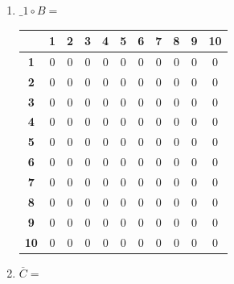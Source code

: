 \documentclass[a4paper,14pt]{extarticle}
\begin{document}
\begin{enumerate}[label=1.\arabic*.]
\begin{enumerate}[1) ]
		      \item $\_1 \circ B = $  \begin{tabular}{|c|c|c|c|c|c|c|c|c|c|c|}
			            \hline
			                              & \textbf{1} & \textbf{2} & \textbf{3} & \textbf{4} & \textbf{5} & \textbf{6} & \textbf{7} & \textbf{8} & \textbf{9} & \textbf{10} \\
			            \hline\textbf{1}  & 0          & 0          & 0          & 0          & 0          & 0          & 0          & 0          & 0          & 0           \\
			            \hline\textbf{2}  & 0          & 0          & 0          & 0          & 0          & 0          & 0          & 0          & 0          & 0           \\
			            \hline\textbf{3}  & 0          & 0          & 0          & 0          & 0          & 0          & 0          & 0          & 0          & 0           \\
			            \hline\textbf{4}  & 0          & 0          & 0          & 0          & 0          & 0          & 0          & 0          & 0          & 0           \\
			            \hline\textbf{5}  & 0          & 0          & 0          & 0          & 0          & 0          & 0          & 0          & 0          & 0           \\
			            \hline\textbf{6}  & 0          & 0          & 0          & 0          & 0          & 0          & 0          & 0          & 0          & 0           \\
			            \hline\textbf{7}  & 0          & 0          & 0          & 0          & 0          & 0          & 0          & 0          & 0          & 0           \\
			            \hline\textbf{8}  & 0          & 0          & 0          & 0          & 0          & 0          & 0          & 0          & 0          & 0           \\
			            \hline\textbf{9}  & 0          & 0          & 0          & 0          & 0          & 0          & 0          & 0          & 0          & 0           \\
			            \hline\textbf{10} & 0          & 0          & 0          & 0          & 0          & 0          & 0          & 0          & 0          & 0           \\
			            \hline
		            \end{tabular}
		      \item $\overline{C} = $  \begin{tabular}{|c|c|c|c|c|c|c|c|c|c|c|}

\end{tabular}
\end{enumerate}
\end{enumerate}
\end{document}
